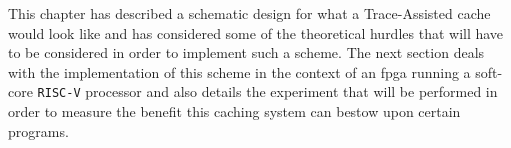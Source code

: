 This chapter has described a schematic design for what a Trace-Assisted cache would look like and has considered some of the theoretical hurdles that will have to be considered in order to implement such a scheme. The next section deals with the implementation of this scheme in the context of an \gls{fpga} running a soft-core \texttt{RISC-V} processor and also details the experiment that will be performed in order to measure the benefit this caching system can bestow upon certain programs. 